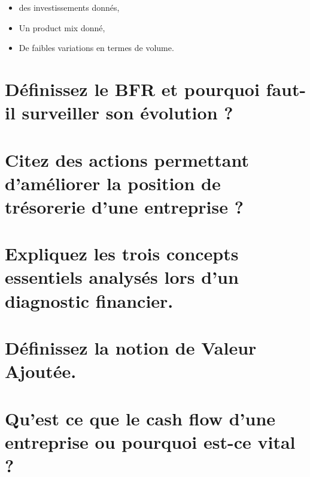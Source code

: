 \documentclass{article}
\begin{document}
\begin{itemize}
	\item des investissements donnés,
	\item Un product mix donné,
	\item De faibles variations en termes de volume.
\end{itemize}

\section{Définissez le BFR et pourquoi faut-il surveiller son évolution ?}
\section{Citez des actions permettant d’améliorer la position de trésorerie d’une entreprise ?}



\section{Expliquez les trois concepts essentiels analysés lors d’un diagnostic financier.}
\section{Définissez la notion de Valeur Ajoutée.}
\section{Qu’est ce que le cash flow d’une entreprise ou pourquoi est-ce vital ?}

\printbibliography
\end{document}
